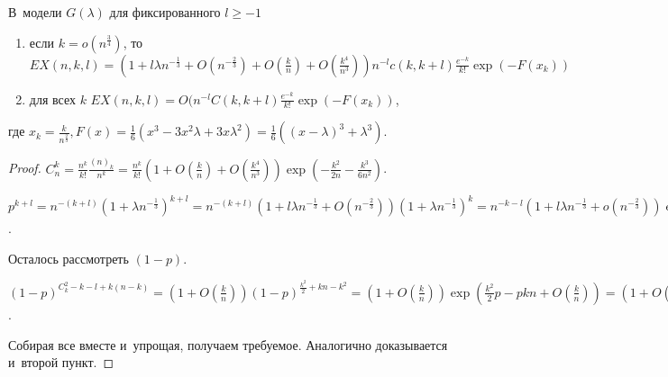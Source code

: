 \documentclass{article}
\begin{document}
\begin{lemma}
	В~модели $G(\lambda)$ для фиксированного $l \ge -1$
	\begin{enumerate}
		\item если $k = o(n^\frac{3}{4})$, то $EX(n, k, l) = (1 + l\lambda n^{-\frac{1}{3}} +
			O(n^{-\frac{2}{3}}) + O(\frac{k}{n}) + O(\frac{k^4}{n^3})) n^{-l} c(k, k + l)
			\frac{e^{-k}}{k!} \exp(-F(x_k))$
		\item для всех $k$ $EX(n, k, l) = O(n^{-l} C(k, k + l) \frac{e^{-k}}{k!} \exp(-F(x_k))$,
	\end{enumerate}
	где $x_k = \frac{k}{n^\frac{2}{3}}, F(x) = \frac{1}{6}(x^3 - 3x^2\lambda + 3x\lambda^2) =
	\frac{1}{6}((x - \lambda)^3 + \lambda^3)$.
\end{lemma}
\begin{proof}
	$C_n^k = \frac{n^k}{k!} \frac{(n)_k}{n^k} = \frac{n^k}{k!}(1 + O(\frac{k}{n})
	+ O(\frac{k^4}{n^3})) \exp(-\frac{k^2}{2n} - \frac{k^3}{6n^2})$.

	$p^{k+l} = n^{-(k+l)} (1 + \lambda n^{-\frac{1}{3}})^{k+l} = n^{-(k+l)} (1 + l \lambda
	n^{-\frac{1}{3}} + O(n^{-\frac{2}{3}}))(1 + \lambda n^{-\frac{1}{3}})^k = n^{-k - l}(1 +
	l\lambda n^{-\frac{1}{3}} + o(n^{-\frac{2}{3}})) \exp(\lambda k n^{-\frac{1}{3}} -
	\frac{\lambda^2 k}{2 n^\frac{2}{3}} + O(\frac{n}{k}))$.

	Осталось рассмотреть $(1 - p)$.

	$(1 - p)^{C_k^2 - k - l + k(n - k)} = (1 + O(\frac{k}{n})) (1 - p)^{\frac{k^2}{2} + kn - k^2} = (1
	+ O(\frac{k}{n})) \exp(\frac{k^2}{2}p - pkn + O(\frac{k}{n})) = (1 + O(\frac{k}{n}))
	\exp(\frac{k^2}{2n} - k + \frac{\lambda k^2}{2 n^\frac{4}{3}} - \lambda k n^{-\frac{1}{3}})$.

	Собирая все вместе и~упрощая, получаем требуемое. Аналогично доказывается и~второй пункт.
\end{proof}
\end{document}
